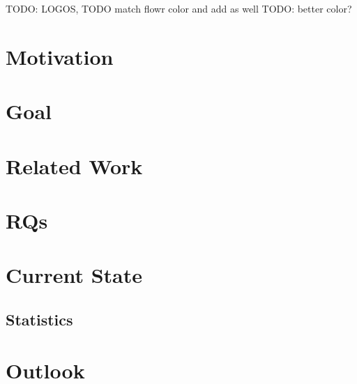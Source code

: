 


\titleframe

\begin{frame}
TODO: LOGOS, TODO match flowr color and add as well
TODO: better color?
\end{frame}

\section{Motivation}
\begin{frame}[c]{\insertsection}
\end{frame}

\section{Goal}
\begin{frame}[c]{\insertsection}
\end{frame}


\section[Related]{Related Work}
\begin{frame}[c]{\insertsection}
\end{frame}

\section{RQs}
\begin{frame}[c]{\insertsection}
\end{frame}

\section[State]{Current State}
\begin{frame}[c]{\insertsection}
\end{frame}

\subsection{Statistics}
\begin{frame}[c]{\insertsubsection}
\end{frame}

\section[Outlook]{Outlook}
\begin{frame}[c]{\insertsection}
\end{frame}


